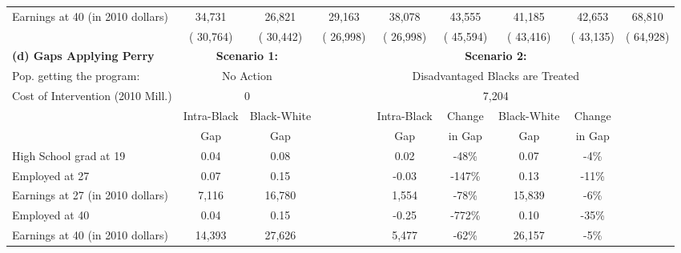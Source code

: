 \begin{table}[htbp]
\begin{center}
\begin{tabular}{lcccccccc}
Earnings at 40 (in 2010 dollars) &       34,731 &       26,821 &       29,163 &       38,078 &       43,555 &       41,185 &       42,653 &       68,810 \\[0.05cm]  
 & (      30,764) & (      30,442) & (      26,998) & (      26,998) & (      45,594) & (      43,416) & (      43,135) & (      64,928)   \\[0.2cm]  
\hline \hline
\textbf{(d) Gaps Applying Perry} & \multicolumn{2}{c}{\textbf{Scenario 1:}} &  &\multicolumn{4}{c}{\textbf{Scenario 2:}}   \\[0.2cm]  
 Pop. getting the program: & \multicolumn{2}{c}{No Action}   &  &\multicolumn{4}{c}{Disadvantaged Blacks are Treated}   \\[0.02cm]  
Cost of Intervention (2010 Mill.) &\multicolumn{2}{c}{ 0 } &
 &\multicolumn{4}{c}{       7,204} &
 \\[0.2cm]  
\hline
&Intra-Black &Black-White & &Intra-Black &Change &Black-White &Change  \\[0.02cm] 
&Gap &Gap & &Gap &in Gap &Gap &in Gap  \\[0.01cm] 
\hline
High School grad at 19 &        0.04&        0.08&&        0.02&         -48\% &        0.07&          -4\% &
 \\[0.2cm]  
Employed at 27 &        0.07&        0.15&&       -0.03&        -147\% &        0.13&         -11\% &
 \\[0.2cm]  
Earnings at 27 (in 2010 dollars) &       7,116&      16,780&&       1,554&         -78\% &      15,839&          -6\% &
 \\[0.2cm]  
Employed at 40 &        0.04&        0.15&&       -0.25&        -772\% &        0.10&         -35\% &
 \\[0.2cm]  
Earnings at 40 (in 2010 dollars) &      14,393&      27,626&&       5,477&         -62\% &      26,157&          -5\% &
 \\[0.2cm]  
  \hline \hline    \end{tabular}
 \end{center} 
       {\scriptsize  
       {\raggedright 
}}
\end{table}
